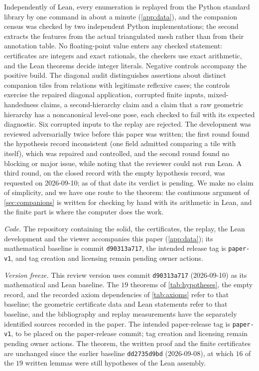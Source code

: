 Independently of Lean, every enumeration is replayed from the Python standard library by one
command in about a minute (\cref{app:data}), and the companion census was checked by two
independent Python implementations; the second extracts the features from the actual
triangulated mesh rather than from their annotation table. No floating-point value enters any
checked statement: certificates are integers and exact rationals, the checkers use exact
arithmetic, and the Lean theorems decide integer literals. Negative controls accompany the
positive build. The diagonal audit distinguishes assertions about distinct companion tiles from
relations with legitimate reflexive cases; the controls exercise the repaired diagonal
application, corrupted finite inputs, mixed-handedness claims, a second-hierarchy claim and a
claim that a raw geometric hierarchy has a noncanonical level-one pose, each
checked to fail with its expected diagnostic. Six corrupted inputs to the replay are rejected. The
development was reviewed adversarially twice before this paper was written; the
first round found the hypothesis record inconsistent (one field admitted comparing a tile with
itself), which was repaired and controlled, and the second round found no blocking or major
issue, while noting that the reviewer could not run Lean. A third round, on the closed record with
the empty hypothesis record, was requested on 2026-09-10; as of that date its verdict is
pending. We make no claim of simplicity, and we
have one route to the theorem: the continuous argument of \cref{sec:companions} is written for
checking by hand with its arithmetic in Lean, and the finite part is where the computer does
the work.

\emph{Code.} The repository containing the solid, the certificates, the replay, the Lean
development and the viewer accompanies this paper (\cref{app:data}); its mathematical baseline is commit
\texttt{d90313a717}, the intended release tag is \texttt{paper-v1}, and tag creation and licensing
remain pending owner actions.

\emph{Version freeze.} This review version uses commit \texttt{d90313a717} (2026-09-10) as its
mathematical and Lean baseline. The $19$ theorems of \cref{tab:hypotheses}, the empty record, and
the recorded axiom dependencies of \cref{tab:axioms} refer to that baseline; the geometric
certificate data and Lean statements refer to that baseline, and the bibliography and replay
measurements have the separately identified sources recorded in the paper. The intended
paper-release tag is \texttt{paper-v1}, to be placed on the paper-release commit; tag creation
and licensing remain pending owner actions. The theorem, the written proof and the finite
certificates are unchanged since the earlier baseline \texttt{dd2735d9bd} (2026-09-08), at which
$16$ of the $19$ written lemmas were still hypotheses of the Lean assembly.

